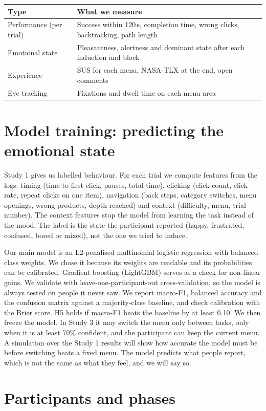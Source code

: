 \documentclass[10pt,a4paper]{article}
\begin{document}
\begin{tabularx}{\linewidth}{@{}lX@{}}
\toprule
Type & What we measure \\
\midrule
Performance (per trial) & Success within 120\,s, completion time, wrong clicks, backtracking, path length \\
Emotional state & Pleasantness, alertness and dominant state after each induction and block \\
Experience & SUS for each menu, NASA-TLX at the end, open comments \\
Eye tracking & Fixations and dwell time on each menu area \\
\bottomrule
\end{tabularx}

\section{Model training: predicting the emotional state}

Study 1 gives us labelled behaviour. For each trial we compute features from the logs:
timing (time to first click, pauses, total time), clicking (click count, click rate, repeat
clicks on one item), navigation (back steps, category switches, menu openings, wrong
products, depth reached) and context (difficulty, menu, trial number). The context features
stop the model from learning the task instead of the mood. The label is the state the
participant reported (happy, frustrated, confused, bored or mixed), not the one we tried to
induce.

Our main model is an L2-penalised multinomial logistic regression with balanced class
weights. We chose it because its weights are readable and its probabilities can be
calibrated. Gradient boosting (LightGBM) serves as a check for non-linear gains. We validate
with leave-one-participant-out cross-validation, so the model is always tested on people it
never saw. We report macro-F1, balanced accuracy and the confusion matrix against a
majority-class baseline, and check calibration with the Brier score. H5 holds if macro-F1
beats the baseline by at least 0.10. We then freeze the model. In Study 3 it may switch the
menu only between tasks, only when it is at least 70\% confident, and the participant can
keep the current menu. A simulation over the Study 1 results will show how accurate the
model must be before switching beats a fixed menu. The model predicts what people report,
which is not the same as what they feel, and we will say so.

\section{Participants and phases}
\end{document}
